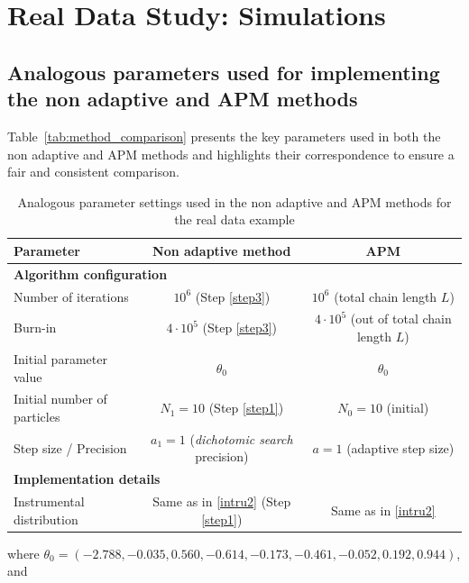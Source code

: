 \documentclass[pdflatex,sn-mathphys-num]{sn-jnl}
\theoremstyle{thmstyleone}
\theoremstyle{thmstyletwo}
\theoremstyle{thmstylethree}
\begin{document}
\section{Real Data Study: Simulations}
\label{appendixE}
\subsection{Analogous parameters used for implementing the non adaptive and APM methods}
\label{appendixE2}
Table~\ref{tab:method_comparison} presents the key parameters used in both the non adaptive and APM methods and highlights their correspondence to ensure a fair and consistent comparison.

\begin{table}[h]
\caption{Analogous parameter settings used in the non adaptive and APM methods for the real data example}
    \centering
    \renewcommand{\arraystretch}{1.3}
    \begin{tabular}{l|c|c}
        \textbf{Parameter} & \textbf{Non adaptive method} & \textbf{APM} \\
        \hline
        \multicolumn{3}{l}{\textbf{Algorithm configuration}} \\
        \hline
        Number of iterations & $10^6$ (Step \ref{step3}) & $10^6$ (total chain length $L$) \\
        Burn-in & $4 \cdot 10^5$ (Step \ref{step3}) & $4 \cdot 10^5$ (out of total chain length $L$) \\
        Initial parameter value & $\theta_0 $ & $\theta_0$ \\
        Initial number of particles & $N_1 = 10$ (Step \ref{step1}) & $N_0 = 10$ (initial) \\
        Step size / Precision & $a_1 = 1$ (\textit{dichotomic search} precision) & $a = 1$ (adaptive step size) \\
        \hline
        \multicolumn{3}{l}{\textbf{Implementation details}} \\
        \hline
        Instrumental distribution & Same as in \eqref{intru2} (Step \ref{step1}) & Same as in \eqref{intru2}\\
    \end{tabular}
    \label{tab:method_comparison2}
\end{table}
\noindent
where $\theta_0= (-2.788, -0.035, 0.560, -0.614, -0.173, -0.461, -0.052, 0.192, 0.944)$, and 
\end{document}
